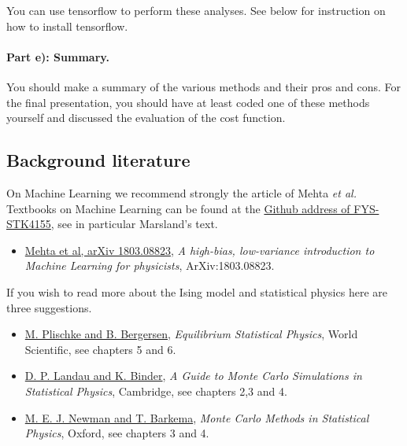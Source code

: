 \documentclass[%
oneside,                 %
final,                   %
10pt]{article}
\begin{document}
You can use tensorflow  to perform these analyses. See below for instruction on how to install tensorflow.


\paragraph{Part e):  Summary.}
You should make a summary of the various methods and their pros and cons. For the final presentation, you should have at least coded one of these methods yourself and discussed the evaluation of the cost function. 

\subsection*{Background literature}

On Machine Learning we recommend strongly the article of Mehta \emph{et al.}
Textbooks on Machine Learning can be found at the \href{{https://github.com/CompPhysics/MachineLearning/tree/master/doc/Textbooks}}{Github address of FYS-STK4155}, see in particular Marsland's text. 

\begin{itemize}
  \item \href{{https://arxiv.org/abs/1803.08823}}{Mehta et al, arXiv 1803.08823}, \emph{A high-bias, low-variance introduction to Machine Learning for physicists}, ArXiv:1803.08823.
\end{itemize}

\noindent
If you wish to read more about the Ising model and statistical physics here are three suggestions.

\begin{itemize}
  \item \href{{http://www.worldscientific.com/worldscibooks/10.1142/5660}}{M. Plischke and B. Bergersen}, \emph{Equilibrium Statistical Physics}, World Scientific, see chapters 5 and 6.

  \item \href{{http://www.cambridge.org/no/academic/subjects/physics/computational-science-and-modelling/guide-monte-carlo-simulations-statistical-physics-4th-edition?format=HB}}{D. P. Landau and K. Binder}, \emph{A Guide to Monte Carlo Simulations in Statistical Physics}, Cambridge, see chapters 2,3 and 4.

  \item \href{{https://global.oup.com/academic/product/monte-carlo-methods-in-statistical-physics-9780198517979?cc=no&lang=en&}}{M. E. J. Newman and T. Barkema}, \emph{Monte Carlo Methods in Statistical Physics}, Oxford, see chapters 3 and 4.
\end{itemize}
\end{document}
